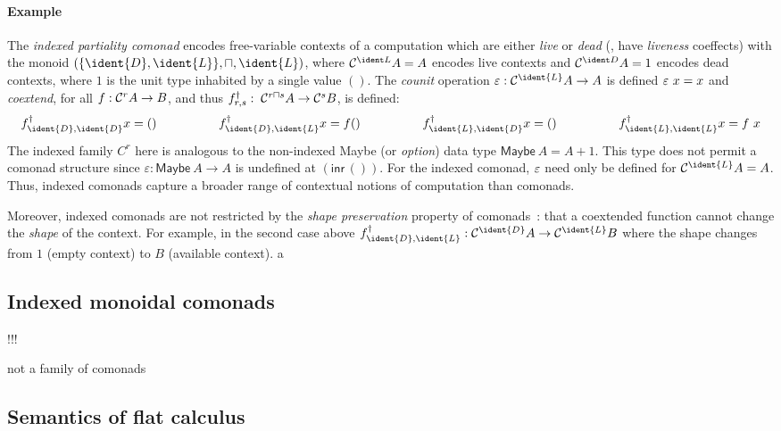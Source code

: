 \paragraph{Example}
The \emph{indexed partiality comonad} encodes free-variable contexts
of a computation which are either \emph{live} or \emph{dead} (\ie{}, have
\emph{liveness} coeffects) with the monoid $(\{\ident{D}, \ident{L}\},
\sqcap, \ident{L})$, where $\ccat^{\ident L} A = A$ encodes live
contexts and $\ccat^{\ident D} A = 1$ encodes dead contexts,
where $1$ is the unit type inhabited by a single value $()$.
The \emph{counit} operation $\counit{} : \ccat^{\ident{L}} A \rightarrow A$
is defined $\varepsilon\ x = x$ and \emph{coextend},
for all $f : \mathcal{C}^r A \rightarrow B$, and thus
$f^\dagger_{r, s} : \; \mathcal{C}^{r \sqcap s} A \rightarrow \mathcal{C}^s B$,
is defined:
%
\begin{align*}
\begin{array}{llll}
\cobind{f}{\ident{D}, \ident{D}} x = () \qquad\qquad & 
\cobind{f}{\ident{D}, \ident{L}} x = f () \qquad\qquad &
\cobind{f}{\ident{L}, \ident{D}} x = () \qquad\qquad &
\cobind{f}{\ident{L}, \ident{L}} x = f~x 
\end{array}
\end{align*}
%
The indexed family $C^r$ here is analogous to the non-indexed \textsf{Maybe} (or \emph{option})
data type $\mathsf{Maybe}\ A = A + 1$.  This
type does not permit a comonad structure since
$\varepsilon : \mathsf{Maybe}\ A \rightarrow A$ is undefined at $(\textsf{inr} \, ())$. 
For the indexed comonad, $\varepsilon$ need only be defined
 for $\ccat^{\ident{L}} A = A$. Thus, indexed comonads capture a broader range of
 contextual notions of computation than comonads.

 Moreover, indexed comonads are not restricted by the \emph{shape
   preservation} property of comonads~\cite{orchard12codo}: that
 a coextended function cannot change the \emph{shape} of the
 context. For example, in the second case above $f^\dagger_{\ident{D},
   \ident{L}} : \ccat^{\ident{D}} A \rightarrow \ccat^{\ident{L}} B$
 where the shape changes from $1$ (empty context) to $B$ (available
 context). 
a

\subsection{Indexed monoidal comonads}

!!! 

not a family of comonads

\subsection{Semantics of flat calculus}

